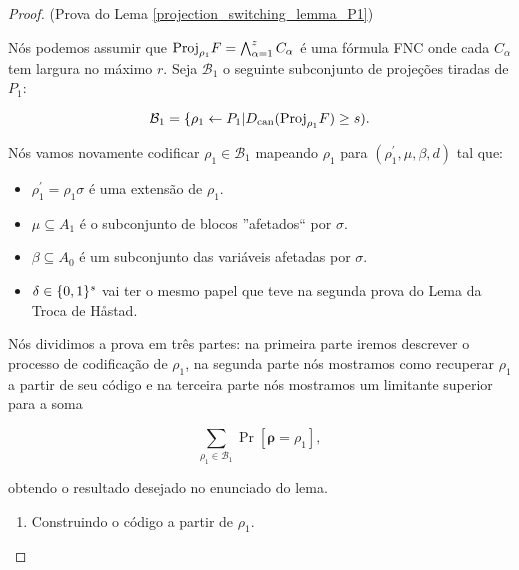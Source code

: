 \begin{proof} (Prova do Lema \ref{projection_switching_lemma_P1})

Nós podemos assumir que $\text{Proj}_{\rho_{1}}F = \bigwedge_{\alpha = 1}^{z} C_{\alpha}$ é uma fórmula FNC onde cada $C_{\alpha}$ tem largura no máximo $r$. Seja $\mathcal{B}_{1}$ o seguinte subconjunto de projeções tiradas de $P_{1}$:

\begin{equation*}
	\mathcal{B}_{1} = \{ \rho_{1} \leftarrow P_{1} \lvert D_{\text{can}}(\text{Proj}_{\rho_{1}}F) \geq s).
\end{equation*}

Nós vamos novamente codificar $\rho_{1} \in \mathcal{B}_{1}$ mapeando $\rho_{1}$ para $(\rho_{1}^{\prime}, \mu, \beta, d)$ tal que:

\begin{itemize}

	\item $\rho_{1}^{\prime} = \rho_{1}\sigma$ é uma extensão de $\rho_{1}$.
	
	\item $\mu \subseteq A_{1}$ é o subconjunto de blocos ''afetados`` por $\sigma$.
	
	\item $\beta \subseteq A_{0}$ é um subconjunto das variáveis afetadas por $\sigma$.
	
	\item $\delta \in \{0, 1\}^{s}$ vai ter o mesmo papel que teve na segunda prova do Lema da Troca de Håstad.
	
\end{itemize}

Nós dividimos a prova em três partes: na primeira parte iremos descrever o processo de codificação de $\rho_{1}$, na segunda parte nós mostramos como recuperar $\rho_{1}$ a partir de seu código e na terceira parte nós mostramos um limitante superior para a soma

\begin{equation} \label{projection_switching_lemma_proof_sum}
	\sum_{\rho_{1} \in \mathcal{B}_{1}} \Pr[\boldsymbol{\rho} = \rho_{1}],
\end{equation}

obtendo o resultado desejado no enunciado do lema.

\begin{enumerate}

	\item Construindo o código a partir de $\rho_{1}$.
	

\end{enumerate}
\end{proof}
